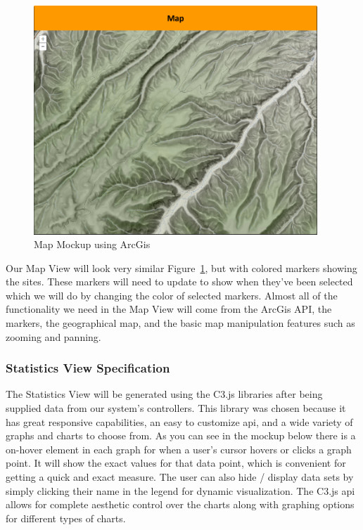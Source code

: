 \begin{figure}[h]
	\centering
	\includegraphics[width=0.95\textwidth]{map_mockup.png}
	\captionsetup{justification=centering}
	\caption{
		Map Mockup using ArcGis
	}
	\label{fig:map_mockup}
\end{figure}

Our Map View will look very similar Figure~\ref{fig:map_mockup}, but with colored markers showing the sites. These markers will need to update to show when they’ve been selected which we will do by changing the color of selected markers. Almost all of the functionality we need in the Map View will come from the ArcGis API, the markers, the geographical map, and the basic map manipulation features such as zooming and panning.

\subsubsection{Statistics View Specification}
The Statistics View will be generated using the C3.js libraries after being supplied data from our system’s controllers. This library was chosen because it has great responsive capabilities, an easy to customize api, and a wide variety of graphs and charts to choose from. As you can see in the mockup below there is a on-hover element in each graph for when a user’s cursor hovers or clicks a graph point. It will show the exact values for that data point, which is convenient for getting a quick and exact measure. The user can also hide / display data sets by simply clicking their name in the legend for dynamic visualization. The C3.js api allows for complete aesthetic control over the charts along with graphing options for different types of charts. 

